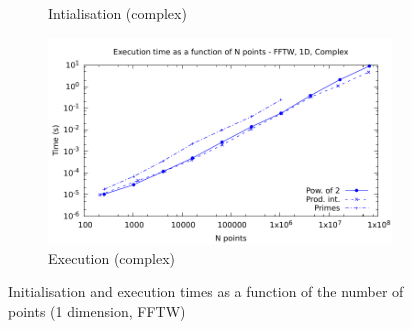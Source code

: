 \documentclass[12pt, a4paper]{article}
\begin{document}
\begin{figure}[H]
\begin{subfigure}{.5\textwidth}
\caption{Intialisation (complex)}
\label{1DFFTWCI}
\end{subfigure}%
\begin{subfigure}{.5\textwidth}
\centering
\includegraphics[width=.9\linewidth]{graphs/1d-fftw-exec-c.pdf}
\caption{Execution (complex)}
\label{1DFFTWC}
\end{subfigure}
\caption{Initialisation and execution times as a function of the number of points (1 dimension, FFTW)}
\label{1DFFTW}
\end{figure}
\end{document}
